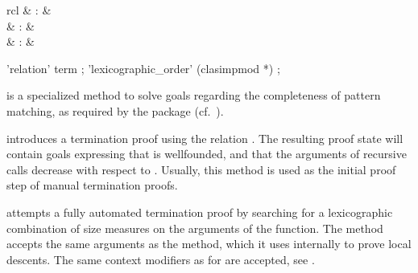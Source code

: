 \begin{isabellebody}
\begin{isamarkuptext}
\begin{descr}
  \end{descr}%
\end{isamarkuptext}%
\isamarkuptrue%
%
\isamarkuptrue%
%
\begin{isamarkuptext}%
\begin{matharray}{rcl}
    \hypertarget{method.HOL.pat-completeness}{\hyperlink{method.HOL.pat-completeness}{\mbox{}}} & : & \isarmeth \\
    \hypertarget{method.HOL.relation}{\hyperlink{method.HOL.relation}{\mbox{}}} & : & \isarmeth \\
    \hypertarget{method.HOL.lexicographic-order}{\hyperlink{method.HOL.lexicographic-order}{\mbox{}}} & : & \isarmeth \\
  \end{matharray}

  \begin{rail}
    'relation' term
    ;
    'lexicographic\_order' (clasimpmod *)
    ;
  \end{rail}

  \begin{descr}

  \item [\hyperlink{method.HOL.pat-completeness}{\mbox{\isa{pat{\isacharunderscore}completeness}}}] is a specialized method to
  solve goals regarding the completeness of pattern matching, as
  required by the \hyperlink{command.HOL.function}{\mbox{}} package (cf.\
  \cite{isabelle-function}).

  \item [\hyperlink{method.HOL.relation}{\mbox{\isa{relation}}}~] introduces a termination
  proof using the relation .  The resulting proof state will
  contain goals expressing that  is wellfounded, and that the
  arguments of recursive calls decrease with respect to \isa{R}.
  Usually, this method is used as the initial proof step of manual
  termination proofs.

  \item [\hyperlink{method.HOL.lexicographic-order}{\mbox{\isa{lexicographic{\isacharunderscore}order}}}] attempts a fully
  automated termination proof by searching for a lexicographic
  combination of size measures on the arguments of the function. The
  method accepts the same arguments as the \hyperlink{method.auto}{\mbox{}} method,
  which it uses internally to prove local descents.  The same context
  modifiers as for \hyperlink{method.auto}{\mbox{\isa{auto}}} are accepted, see
  \secref{sec:clasimp}.


\end{descr}
\end{isamarkuptext}
\end{isabellebody}
